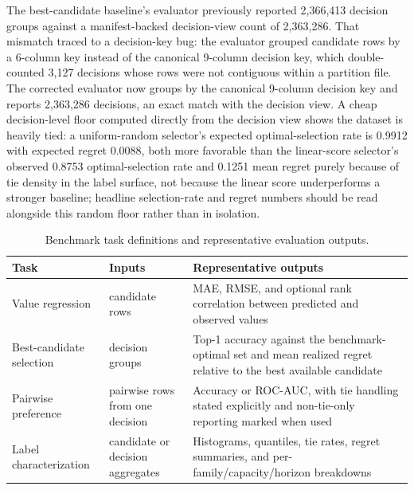 The best-candidate baseline's evaluator previously reported 2,366,413 decision groups against a manifest-backed decision-view count of 2,363,286. That mismatch traced to a decision-key bug: the evaluator grouped candidate rows by a 6-column key instead of the canonical 9-column decision key, which double-counted 3,127 decisions whose rows were not contiguous within a partition file. The corrected evaluator now groups by the canonical 9-column decision key and reports 2,363,286 decisions, an exact match with the decision view. A cheap decision-level floor computed directly from the decision view shows the dataset is heavily tied: a uniform-random selector's expected optimal-selection rate is 0.9912 with expected regret 0.0088, both more favorable than the linear-score selector's observed 0.8753 optimal-selection rate and 0.1251 mean regret purely because of tie density in the label surface, not because the linear score underperforms a stronger baseline; headline selection-rate and regret numbers should be read alongside this random floor rather than in isolation.





\begin{table}[t]
  \caption{Benchmark task definitions and representative evaluation outputs.}
  \label{tab:task-definitions}
  \centering
  \footnotesize
  \begin{tabularx}{\columnwidth}{@{}P{0.22\columnwidth}P{0.20\columnwidth}L@{}}
    \toprule
    Task & Inputs & Representative outputs \\
    \midrule
    Value regression & candidate rows & MAE, RMSE, and optional rank correlation between predicted and observed values \\
    Best-candidate selection & decision groups & Top-1 accuracy against the benchmark-optimal set and mean realized regret relative to the best available candidate \\
    Pairwise preference & pairwise rows from one decision & Accuracy or ROC-AUC, with tie handling stated explicitly and non-tie-only reporting marked when used \\
    Label characterization & candidate or decision aggregates & Histograms, quantiles, tie rates, regret summaries, and per-family/capacity/horizon breakdowns \\
    \bottomrule
  \end{tabularx}
\end{table}

